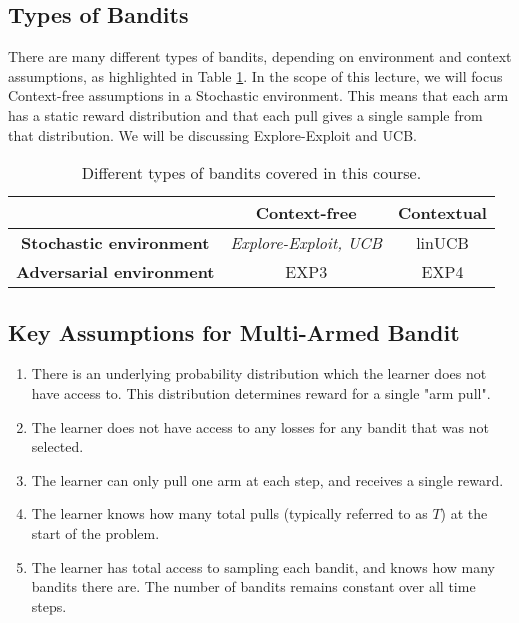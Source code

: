 \documentclass[11pt]{article}
\begin{document}
\subsection{Types of Bandits}

There are many different types of bandits, depending on environment and context assumptions, as highlighted in Table \ref{tab:table1}. In the scope of this lecture, we will focus Context-free assumptions in a Stochastic environment. This means that each arm has a static reward distribution and that each pull gives a single sample from that distribution. We will be discussing Explore-Exploit and UCB.

\begin{table}[ht!]
  \begin{center}
    \caption{Different types of bandits covered in this course.}
    \label{tab:table1}
    \begin{tabular}{|c|c|c|}
      \hline
        & \textbf{Context-free} & \textbf{Contextual}\\
      \hline
      \textbf{Stochastic environment} & \textit{Explore-Exploit, UCB} & linUCB\\
      \hline
      \textbf{Adversarial environment} & EXP3 & EXP4\\
      \hline
    \end{tabular}
  \end{center}
\end{table}

\subsection{Key Assumptions for Multi-Armed Bandit}
\begin{enumerate}
    \item There is an underlying probability distribution which the learner does not have access to. This distribution determines reward for a single "arm pull".
    \item The learner does not have access to any losses for any bandit that was not selected. 
    \item The learner can only pull one arm at each step, and receives a single reward.
    \item The learner knows how many total pulls (typically referred to as $T$) at the start of the problem. 
    \item The learner has total access to sampling each bandit, and knows how many bandits there are. The number of bandits remains constant over all time steps. 
\end{enumerate}
\end{document}
